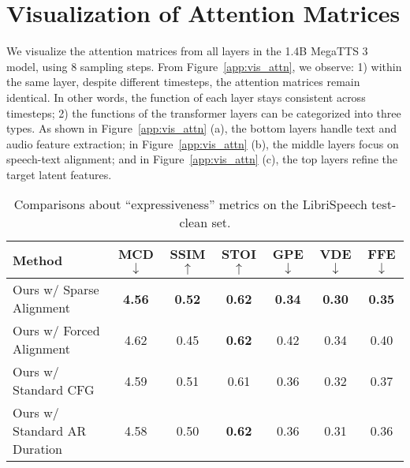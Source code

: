 \section{Visualization of Attention Matrices}
\label{app:vis_diff_attn}
We visualize the attention matrices from all layers in the 1.4B MegaTTS 3 model, using 8 sampling steps. From Figure~\ref{app:vis_attn}, we observe: 1) within the same layer, despite different timesteps, the attention matrices remain identical. In other words, the function of each layer stays consistent across timesteps; 2) the functions of the transformer layers can be categorized into three types. As shown in Figure~\ref{app:vis_attn} (a), the bottom layers handle text and audio feature extraction; in Figure~\ref{app:vis_attn} (b), the middle layers focus on speech-text alignment; and in Figure~\ref{app:vis_attn} (c), the top layers refine the target latent features.



\begin{table*}[!ht]
\small
\centering
\begin{tabular}{@{}l|cccccc@{}}
\toprule
\bfseries Method & \bfseries MCD$\downarrow$ & \bfseries SSIM$\uparrow$ & \bfseries STOI$\uparrow$ & \bfseries GPE$\downarrow$ & \bfseries VDE$\downarrow$ & \bfseries FFE$\downarrow$ \\       
\midrule
Ours w/ Sparse Alignment & \bfseries 4.56 & \bfseries 0.52  & \bfseries 0.62 & \bfseries 0.34 & \bfseries 0.30 & \bfseries 0.35 \\
Ours w/ Forced Alignment &  4.62   & 0.45 & \bfseries 0.62 & 0.42 & 0.34 & 0.40 \\
Ours w/ Standard CFG & 4.59 & 0.51  & 0.61 & 0.36 & 0.32 & 0.37 \\
Ours w/ Standard AR Duration & 4.58 & 0.50  & \bfseries 0.62 & 0.36 & 0.31 & 0.36 \\
\bottomrule
\end{tabular}
\caption{Comparisons about ``expressiveness'' metrics on the LibriSpeech test-clean set.}
\label{table:expressiveness_exp_libritest_all}
\end{table*}


